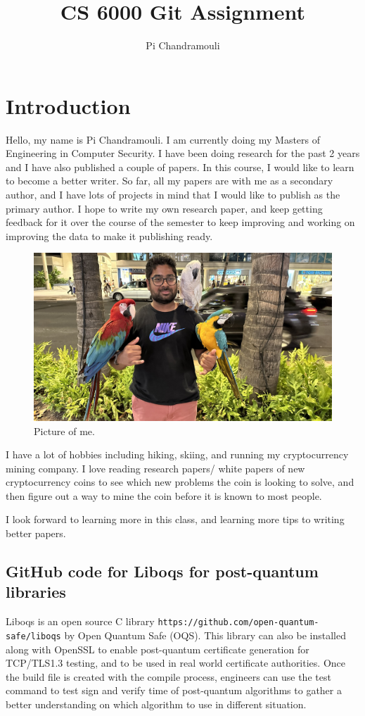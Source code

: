 \documentclass{article}
\title{CS 6000 Git Assignment}
\author{Pi Chandramouli}
\begin{document}
\maketitle


\section{Introduction}

Hello, my name is Pi Chandramouli. I am currently doing my Masters of Engineering in Computer Security. I have been doing research for the past 2 years and I have also published a couple of papers. In this course, I would like to learn to become a better writer. So far, all my papers are with me as a secondary author, and I have lots of projects in mind that I would like to publish as the primary author. I hope to write my own research paper, and keep getting feedback for it over the course of the semester to keep improving and working on improving the data to make it publishing ready.

\begin{figure}[!htb]
\centering
\includegraphics[width=0.5\columnwidth]{pi-F23.jpeg}
\caption{\label{fig:me} Picture of me.}
\end{figure}

I have a lot of hobbies including hiking, skiing, and running my cryptocurrency mining company. I love reading research papers/ white papers of new cryptocurrency coins to see which new problems the coin is looking to solve, and then figure out a way to mine the coin before it is known to most people. 

I look forward to learning more in this class, and learning more tips to writing better papers.

\subsection{GitHub code for Liboqs for post-quantum libraries}
Liboqs is an open source C library \nolinkurl{https://github.com/open-quantum-safe/liboqs} by Open Quantum Safe (OQS). This library can also be installed along with OpenSSL to enable post-quantum certificate generation for TCP/TLS1.3 testing, and to be used in real world certificate authorities. Once the build file is created with the compile process, engineers can use the test command to test sign and verify time of post-quantum algorithms to gather a better understanding on which algorithm to use in different situation.
\end{document}
